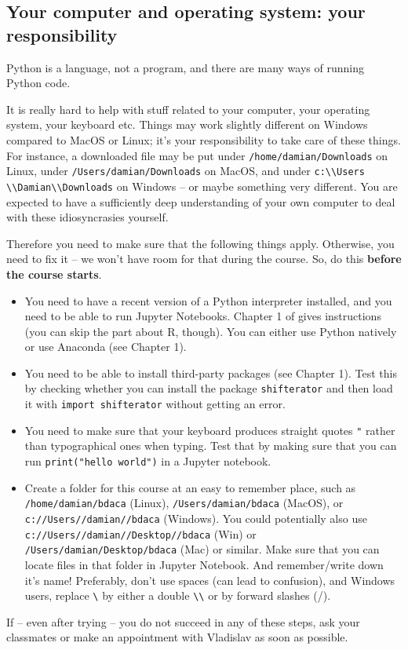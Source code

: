 \documentclass[a4paper,10pt,twocolumn]{report}
\newenvironment{corona}{%
	\begin{shaded*}%
	}{%
	\end{shaded*}%
}
\begin{document}
\begin{corona}
\section{Your computer and operating system: your responsibility}	
\label{sec:yourcomputer}
Python is a language, not a program, and there are many ways of running Python code. 

It is really hard to help with stuff related to your computer, your operating system, your keyboard etc. Things may work slightly different on Windows compared to MacOS or Linux; it's your responsibility to take care of these things. For instance, a downloaded file may be put under \texttt{/home/damian/Downloads} on Linux, under \texttt{/Users/damian/Downloads} on MacOS, and under \texttt{c:\textbackslash \textbackslash Users \textbackslash \textbackslash Damian\textbackslash \textbackslash Downloads} on Windows -- or maybe something very different. You are expected to have a sufficiently deep understanding of your own computer to deal with these idiosyncrasies yourself.

Therefore you need to make sure that the following things apply. Otherwise, you need to fix it -- we won't have room for that during the course. So, do this \textbf{before the course starts}.

\begin{itemize}
\item You need to have a recent version of a Python interpreter installed, and you need to be able to run Jupyter Notebooks. Chapter 1 of \cite{cssbook} gives instructions (you can skip the part about R, though). You can either use Python natively or use Anaconda (see Chapter 1).
	\item You need to be able to install third-party packages (see Chapter 1). Test this by checking whether you can install the package \texttt{shifterator} and then load it with \texttt{import shifterator} without getting an error.
	\item You need to make sure that your keyboard produces straight quotes \texttt{"} rather than typographical ones when typing. Test that by making sure that you can run \texttt{print("hello world")} in a Jupyter notebook.
	\item Create a folder for this course at an easy to remember place, such as \texttt{/home/damian/bdaca} (Linux), \texttt{/Users/damian/bdaca} (MacOS), or \texttt{c://Users//damian//bdaca} (Windows). You could potentially also use \texttt{c://Users//damian//Desktop//bdaca} (Win) or \texttt{/Users/damian/Desktop/bdaca} (Mac) or similar. Make sure that you can locate files in that folder in Jupyter Notebook. And remember/write down it's name! Preferably, don't use spaces (can lead to confusion), and Windows users, replace \texttt{\textbackslash} by either a double \texttt{\textbackslash \textbackslash} or by forward slashes (/).
\end{itemize}
If -- even after trying -- you do not succeed in any of these steps, ask your classmates or make an appointment with Vladislav as soon as possible.


\end{corona}
\end{document}
